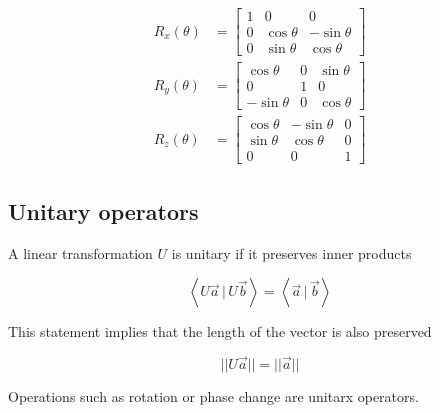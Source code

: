 \documentclass{article}
\newcommand{\braket}[1]{\left\langle#1\right\rangle}
\newcommand{\innerprod}[2]{\braket{#1\,|\,#2}}
\begin{document}
\begin{align*}
    R_x(\theta)&=
    \begin{bmatrix} 
        1 & 0 & 0 \\
        0 & \cos\theta & -\sin\theta \\
        0 & \sin\theta & \cos\theta
    \end{bmatrix}
    \\
    R_y(\theta)&=
    \begin{bmatrix} 
        \cos\theta & 0 & \sin\theta \\
        0 & 1 & 0 \\
        -\sin\theta & 0 & \cos\theta
    \end{bmatrix}
    \\
    R_z(\theta)&=
    \begin{bmatrix} 
        \cos\theta & -\sin\theta & 0 \\
        \sin\theta & \cos\theta & 0 \\
        0 & 0 & 1
    \end{bmatrix}
\end{align*}

\subsection{Unitary operators}

A linear transformation \(U\) is unitary if it preserves inner products

\[
    \innerprod{U\vec{a}}{U\vec{b}} = \innerprod{\vec{a}}{\vec{b}}
\]

This statement implies that the length of the vector is also preserved

\[
    ||U\vec{a}|| = ||\vec{a}||
\]

Operations such as rotation or phase change are unitarx operators.
\end{document}
